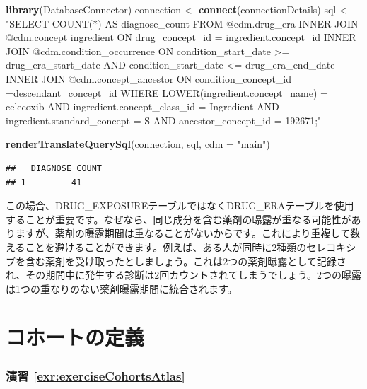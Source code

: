 \documentclass[
  11pt]{book}
\newenvironment{Shaded}{\begin{snugshade}}{\end{snugshade}}
\newcommand{\AttributeTok}[1]{\textcolor[rgb]{0.13,0.29,0.53}{#1}}
\newcommand{\FunctionTok}[1]{\textcolor[rgb]{0.13,0.29,0.53}{\textbf{#1}}}
\newcommand{\NormalTok}[1]{#1}
\newcommand{\OtherTok}[1]{\textcolor[rgb]{0.56,0.35,0.01}{#1}}
\newcommand{\StringTok}[1]{\textcolor[rgb]{0.31,0.60,0.02}{#1}}
\theoremstyle{definition}
\theoremstyle{definition}
\theoremstyle{definition}
\theoremstyle{definition}
\theoremstyle{remark}
\begin{document}
\begin{Shaded}
\begin{Highlighting}[]
\FunctionTok{library}\NormalTok{(DatabaseConnector)}
\NormalTok{connection }\OtherTok{\textless{}{-}} \FunctionTok{connect}\NormalTok{(connectionDetails)}
\NormalTok{sql }\OtherTok{\textless{}{-}} \StringTok{"SELECT COUNT(*) AS diagnose\_count}
\StringTok{FROM @cdm.drug\_era}
\StringTok{INNER JOIN @cdm.concept ingredient}
\StringTok{  ON drug\_concept\_id = ingredient.concept\_id}
\StringTok{INNER JOIN @cdm.condition\_occurrence}
\StringTok{  ON condition\_start\_date \textgreater{}= drug\_era\_start\_date}
\StringTok{    AND condition\_start\_date \textless{}= drug\_era\_end\_date}
\StringTok{INNER JOIN @cdm.concept\_ancestor}
\StringTok{  ON condition\_concept\_id =descendant\_concept\_id}
\StringTok{WHERE LOWER(ingredient.concept\_name) = \textquotesingle{}celecoxib\textquotesingle{}}
\StringTok{  AND ingredient.concept\_class\_id = \textquotesingle{}Ingredient\textquotesingle{}}
\StringTok{  AND ingredient.standard\_concept = \textquotesingle{}S\textquotesingle{}}
\StringTok{  AND ancestor\_concept\_id = 192671;"}

\FunctionTok{renderTranslateQuerySql}\NormalTok{(connection, sql, }\AttributeTok{cdm =} \StringTok{"main"}\NormalTok{)}
\end{Highlighting}
\end{Shaded}

\begin{verbatim}
##   DIAGNOSE_COUNT
## 1         41
\end{verbatim}

この場合、DRUG\_EXPOSUREテーブルではなくDRUG\_ERAテーブルを使用することが重要です。なぜなら、同じ成分を含む薬剤の曝露が重なる可能性がありますが、薬剤の曝露期間は重なることがないからです。これにより重複して数えることを避けることができます。例えば、ある人が同時に2種類のセレコキシブを含む薬剤を受け取ったとしましょう。これは2つの薬剤曝露として記録され、その期間中に発生する診断は2回カウントされてしまうでしょう。2つの曝露は1つの重なりのない薬剤曝露期間に統合されます。

\section{コホートの定義}\label{Cohortsanswers}

\subsubsection*{演習 \ref{exr:exerciseCohortsAtlas}}\label{ux6f14ux7fd2-refexrexercisecohortsatlas}
\end{document}
